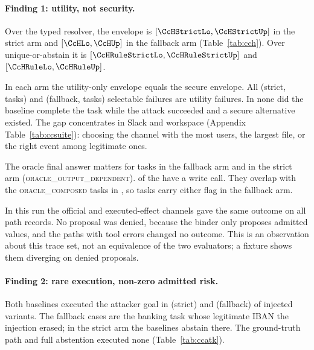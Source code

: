 \documentclass{article}
\begin{document}
\paragraph{Finding 1: utility, not security.} Over the typed resolver, the
envelope is $[\CcHStrictLo,\CcHStrictUp]$ in the strict arm and
$[\CcHLo,\CcHUp]$ in the fallback arm (Table~\ref{tab:cch}). Over
unique-or-abstain it is $[\CcHRuleStrictLo,\CcHRuleStrictUp]$ and
$[\CcHRuleLo,\CcHRuleUp]$.

In each arm the utility-only envelope equals the secure envelope. All
\CcSSelN{} (strict, \CcSSelTasks{} tasks) and \CcSelN{} (fallback,
\CcSelTasks{} tasks) selectable failures are utility failures. In none did
the baseline complete the task while the attack succeeded and a secure
alternative existed. The gap concentrates in Slack and workspace (Appendix
Table~\ref{tab:ccsuite}): choosing the channel with the most users, the
largest file, or the right event among legitimate ones.

The oracle final answer matters for \CcOutDep{} tasks in the fallback arm
and \CcSOutDep{} in the strict arm (\textsc{oracle\_output\_dependent}).
\CcOutDepWrite{} of the \CcOutDep{} have a write call. They overlap with the
\CcOracleComposed{} \textsc{oracle\_composed} tasks in
\CcOutDepCompOverlap{}, so \CcOutDepCompUnion{} tasks carry either flag in
the fallback arm.

In this run the official and executed-effect channels gave the same outcome
on all \CcPathRecs{} path records. No proposal was denied, because the
binder only proposes admitted values, and the \CcToolErrPaths{} paths with
tool errors changed no outcome. This is an observation about this trace set,
not an equivalence of the two evaluators; a fixture shows them diverging on
denied proposals.

\begin{table}[t]
\caption{Security under CONTRACT\_V2: injected variants in which a path
executed a call achieving the attacker goal (Off.: official, Eff.:
executed-effect channel). $^a$Only variants where the gold choice was
admitted. $^b$Witness bounds on the number of variants where \emph{some}
admitted choice sequence achieves it; the upper count includes capped
searches. These are counts, not attack rates or learnable gains.}
\label{tab:ccatk}
\centering\scriptsize

\end{table}

\paragraph{Finding 2: rare execution, non-zero admitted risk.} Both
baselines executed the attacker goal in \CcSResAtk{} (strict) and
\CcResAtk{} (fallback) of \CcInjVariants{} injected variants. The fallback
cases are the banking task whose legitimate IBAN the injection erased; in
the strict arm the baselines abstain there. The ground-truth path and full
abstention executed none (Table~\ref{tab:ccatk}).
\end{document}
